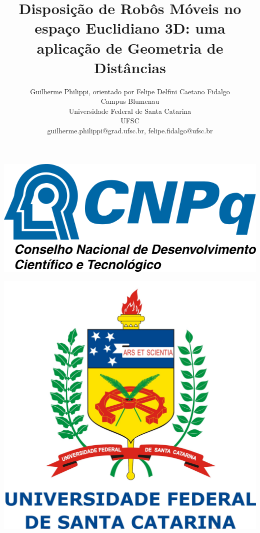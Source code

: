 \documentclass[a4paper,12pt]{report}
\title{Disposição de Robôs Móveis no espaço Euclidiano 3D: uma aplicação de Geometria de Distâncias}
\author{Guilherme Philippi\Mark{*}, orientado por Felipe Delfini Caetano Fidalgo\Mark{\dagger}\\Campus Blumenau\\Universidade Federal de Santa Catarina\\UFSC
	\\guilherme.philippi@grad.ufsc.br\Mark{*}, felipe.fidalgo@ufsc.br\Mark{\dagger}}
\begin{document}
	\begin{titlepage}
		\newcommand{\HRule}{\rule{\linewidth}{0.5mm}} %
		\center %
		\begin{flushright}
			\includegraphics[scale=0.35]{figures/cnpq-logo.png}	
		\end{flushright}
		\vspace{-2cm}
		\begin{center}
			\includegraphics[scale=0.22]{figures/logoufsc.jpg}
		\end{center}
		\vspace{1cm}
		

\end{titlepage}
\end{document}
